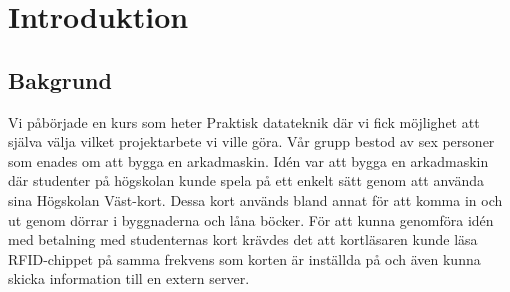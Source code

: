 \documentclass[12pt,fleqn,openany]{book} %
\begin{document}




\pagestyle{empty} %

\tableofcontents %


\pagestyle{fancy} %





\chapter{Introduktion}

\section{Bakgrund}
Vi påbörjade en kurs som heter Praktisk datateknik där vi fick möjlighet att själva välja vilket projektarbete vi ville göra. Vår grupp
bestod av sex personer som enades om att bygga en arkadmaskin. Idén var att bygga en arkadmaskin där studenter på högskolan kunde spela 
på ett enkelt sätt genom att använda sina Högskolan Väst-kort. Dessa kort används bland annat för att komma in och ut genom dörrar i 
byggnaderna och låna böcker. För att kunna genomföra idén med betalning med studenternas kort krävdes det att kortläsaren kunde läsa 
RFID-chippet på samma frekvens som korten är inställda på och även kunna skicka information till en extern server.
\end{document}
